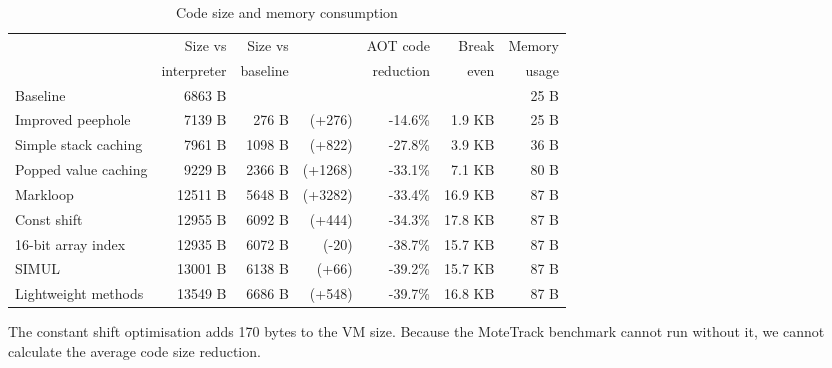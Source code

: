 \begin{table}
\centering
\caption{Code size and memory consumption}
\label{tbl-code-size-and-memory-consumption}
    \begin{threeparttable}
    \begin{tabular}{lrrrrrr} %
    \toprule
                              & Size vs     & Size vs  &                      & AOT code  &   Break & Memory    \\
                              & interpreter & baseline &                      & reduction &   even  & usage     \\
    \midrule
    \midrule
    Baseline                  &     6863 B  &          &                      &           &         & 25 B      \\
    Improved peephole         &     7139 B  &   276 B  & \scriptsize   (+276) &  -14.6\%  &  1.9 KB & 25 B      \\
    Simple stack caching      &     7961 B  &  1098 B  & \scriptsize   (+822) &  -27.8\%  &  3.9 KB & 36 B      \\
    Popped value caching      &     9229 B  &  2366 B  & \scriptsize  (+1268) &  -33.1\%  &  7.1 KB & 80 B      \\
    Markloop                  &    12511 B  &  5648 B  & \scriptsize  (+3282) &  -33.4\%  & 16.9 KB & 87 B      \\
    Const shift               &    12955 B  &  6092 B  & \scriptsize   (+444) &  -34.3\%  & 17.8 KB & 87 B      \\
    16-bit array index        &    12935 B  &  6072 B  & \scriptsize    (-20) &  -38.7\%  & 15.7 KB & 87 B      \\
    SIMUL                     &    13001 B  &  6138 B  & \scriptsize    (+66) &  -39.2\%  & 15.7 KB & 87 B      \\
    Lightweight methods       &    13549 B  &  6686 B  & \scriptsize   (+548) &  -39.7\%  & 16.8 KB & 87 B      \\
    \bottomrule
    \end{tabular}
    \begin{tablenotes}
        \item The constant shift optimisation adds 170 bytes to the VM size. Because the MoteTrack benchmark cannot run without it, we cannot calculate the average code size reduction.
    \end{tablenotes}
    \end{threeparttable}
\end{table}
